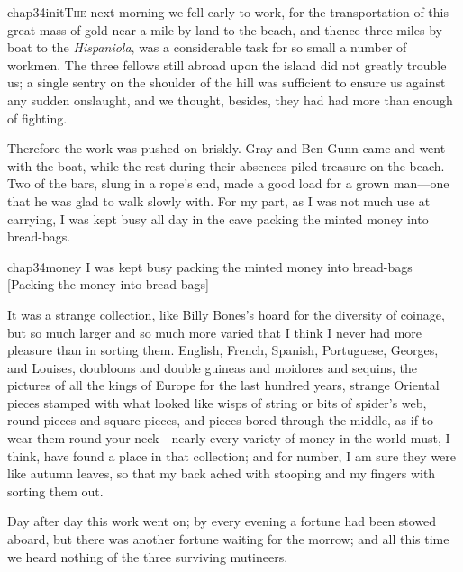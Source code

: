 
\lettrine[lines=5,image=true,findent=2pt]{chap34initT}{he} next morning we fell early to work, for the transportation of this great mass of gold near a mile by land to the beach, and thence three miles by boat to the \textit{Hispaniola}, was a considerable task for so small a number of workmen. The three fellows still abroad upon the island did not greatly trouble us; a single sentry on the shoulder of the hill was sufficient to ensure us against any sudden onslaught, and we thought, besides, they had had more than enough of fighting.

Therefore the work was pushed on briskly. Gray and Ben Gunn came and went with the boat, while the rest during their absences piled treasure on the beach. Two of the bars, slung in a rope's end, made a good load for a grown man—one that he was glad to walk slowly with. For my part, as I was not much use at carrying, I was kept busy all day in the cave packing the minted money into bread-bags.


\begin{bwbigpic}
	[\picsize]
	{chap34money}
	{I was kept busy packing the minted money into bread-bags}
	[Packing the money into bread-bags]
\end{bwbigpic}

It was a strange collection, like Billy Bones's hoard for the diversity of coinage, but so much larger and so much more varied that I think I never had more pleasure than in sorting them. English, French, Spanish, Portuguese, Georges, and Louises, doubloons and double guineas and moidores and sequins, the pictures of all the kings of Europe for the last hundred years, strange Oriental pieces stamped with what looked like wisps of string or bits of spider's web, round pieces and square pieces, and pieces bored through the middle, as if to wear them round your neck—nearly every variety of money in the world must, I think, have found a place in that collection; and for number, I am sure they were like autumn leaves, so that my back ached with stooping and my fingers with sorting them out.

Day after day this work went on; by every evening a fortune had been stowed aboard, but there was another fortune waiting for the morrow; and all this time we heard nothing of the three surviving mutineers.


